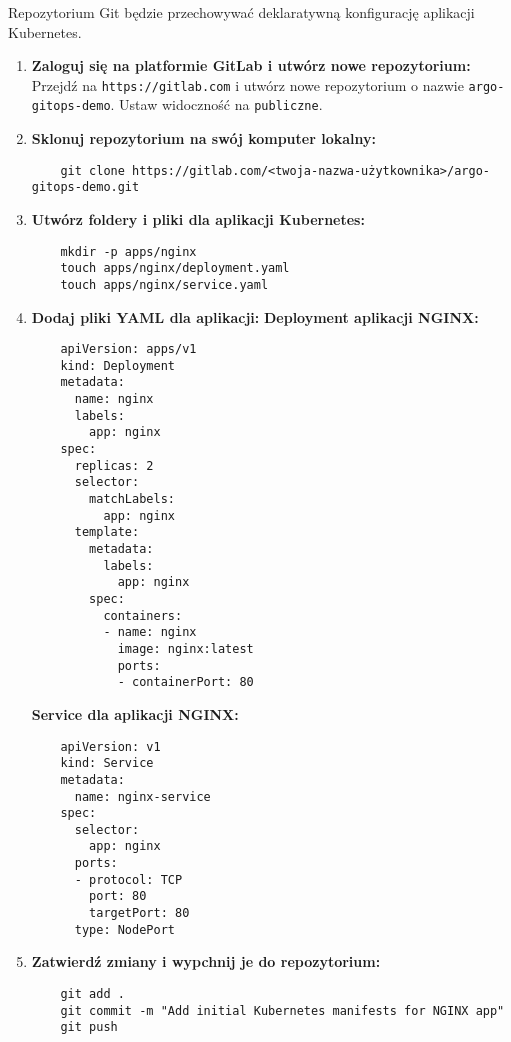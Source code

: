 \documentclass{article}
\begin{document}
Repozytorium Git będzie przechowywać deklaratywną konfigurację aplikacji Kubernetes.

\begin{enumerate}
    \item \textbf{Zaloguj się na platformie GitLab i utwórz nowe repozytorium:}
    Przejdź na \texttt{https://gitlab.com} i utwórz nowe repozytorium o nazwie \texttt{argo-gitops-demo}.
    Ustaw widoczność na \texttt{publiczne}.

    \item \textbf{Sklonuj repozytorium na swój komputer lokalny:}
    \begin{lstlisting}
    git clone https://gitlab.com/<twoja-nazwa-użytkownika>/argo-gitops-demo.git
    \end{lstlisting}

    \item \textbf{Utwórz foldery i pliki dla aplikacji Kubernetes:}
    \begin{lstlisting}
    mkdir -p apps/nginx
    touch apps/nginx/deployment.yaml
    touch apps/nginx/service.yaml
    \end{lstlisting}

    \item \textbf{Dodaj pliki YAML dla aplikacji:}
    \textbf{Deployment aplikacji NGINX:}
    \begin{lstlisting}
    apiVersion: apps/v1
    kind: Deployment
    metadata:
      name: nginx
      labels:
        app: nginx
    spec:
      replicas: 2
      selector:
        matchLabels:
          app: nginx
      template:
        metadata:
          labels:
            app: nginx
        spec:
          containers:
          - name: nginx
            image: nginx:latest
            ports:
            - containerPort: 80
    \end{lstlisting}

    \textbf{Service dla aplikacji NGINX:}
    \begin{lstlisting}
    apiVersion: v1
    kind: Service
    metadata:
      name: nginx-service
    spec:
      selector:
        app: nginx
      ports:
      - protocol: TCP
        port: 80
        targetPort: 80
      type: NodePort
    \end{lstlisting}

    \item \textbf{Zatwierdź zmiany i wypchnij je do repozytorium:}
    \begin{lstlisting}
    git add .
    git commit -m "Add initial Kubernetes manifests for NGINX app"
    git push
    \end{lstlisting}
\end{enumerate}
\end{document}
